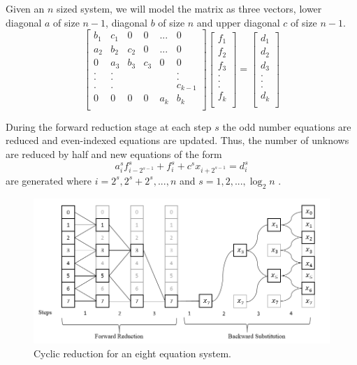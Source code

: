 \documentclass[12pt, oneside]{book}
\theoremstyle{plain}
\theoremstyle{definition}
\begin{document}
Given an $n$ sized system, we will model the matrix as three vectors, lower diagonal $a$ of size $n - 1$, diagonal $b$ of size $n$ and upper diagonal $c$ of size $n - 1$. 
$$
\begin{bmatrix}  
b_1 & c_1 & 0 & 0 & ... & 0 \\ 
a_2 & b_2 & c_2 & 0 & ... & 0 \\ 
0 & a_3 & b_3 & c_3 & 0 & 0 \\ 
. & . &  &  &  & . \\ 
. & . &  &  &  & . \\ 
. & . &  &  &  & c_{k-1} \\ 
0 & 0 & 0 & 0 & a_k & b_k \\ 
\end{bmatrix} \begin{bmatrix}  
f_1 \\ 
f_2 \\ 
f_3 \\ 
.\\ 
.\\ 
.\\ 
f_k \\ 
\end{bmatrix} = \begin{bmatrix} 
d_1 \\ 
d_2 \\ 
d_3 \\ 
.\\ 
.\\ 
.\\ 
d_k \\ 
\end{bmatrix}
$$


During the forward reduction stage  at each step $s$ the odd number equations are reduced and even-indexed equations are updated. Thus, the number of unknows are reduced by half and new equations of the form
\begin{equation}
a_i^{s} f_{i - 2^{s - 1}}^{s} + f_i^{s} + c^{s}  x_{i + 2^{s - 1}} = d_i^s
\end{equation}
are generated where $ i = 2^s, 2^s + 2^s, ... , n$ and $s = 1, 2, ... , \log_2 n$ .

\begin{figure}[!htb]
    \centering
        \includegraphics[scale=0.6]{cyclic.png}
    \caption{Cyclic reduction for an eight equation system.}
\end{figure}
\end{document}
